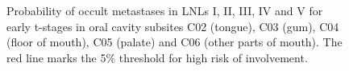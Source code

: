 \documentclass[
  sn-mathphys-num,
]{sn-jnl}
\begin{document}
\begin{figure}
\begin{minipage}{0.50\linewidth}
{}

\subcaption{\label{fig-oral_cavity_no_pos_C04_early}}

\end{minipage}%
%
\begin{minipage}{0.50\linewidth}


\subcaption{\label{fig-oral_cavity_no_pos_C05_early}}

\end{minipage}%
\newline
\begin{minipage}{0.50\linewidth}


\subcaption{\label{fig-oral_cavity_no_pos_C06_early}}

\end{minipage}%

\caption{\label{fig-oral_cavity_early_no_pos}Probability of occult
metastases in LNLs I, II, III, IV and V for early t-stages in oral
cavity subsites C02 (tongue), C03 (gum), C04 (floor of mouth), C05
(palate) and C06 (other parts of mouth). The red line marks the 5\%
threshold for high risk of involvement.}

\end{figure}%
\end{document}
